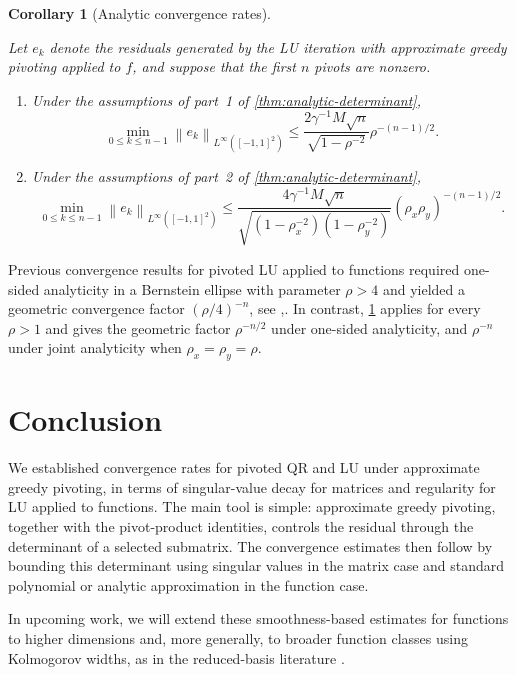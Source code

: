 \documentclass[11pt]{article}
\newtheorem{corollary}[corollary]{Corollary}
\theoremstyle{definition}
\theoremstyle{remark}
\newcommand{\norm}[1]{\left\lVert #1\right\rVert}
\begin{document}
\begin{corollary}[Analytic convergence rates]
\label{cor:functional-analytic-rates}

Let $e_k$ denote the residuals generated by the LU iteration
with approximate greedy pivoting applied to $f$, and suppose that the first $n$
pivots are nonzero.
\begin{enumerate}
\item
Under the assumptions of part~1 of
\cref{thm:analytic-determinant},
\[
    \min_{0\le k\le n-1}
    \norm{e_k}_{L^\infty([-1,1]^2)}
    \le
    \frac{2\gamma^{-1}M\sqrt n}
         {\sqrt{1-\rho^{-2}}}
    \rho^{-(n-1)/2}.
\]

\item
Under the assumptions of part~2 of
\cref{thm:analytic-determinant},
\[
    \min_{0\le k\le n-1}
    \norm{e_k}_{L^\infty([-1,1]^2)}
    \le
    \frac{4\gamma^{-1}M\sqrt n}
         {\sqrt{(1-\rho_x^{-2})(1-\rho_y^{-2})}}
    (\rho_x\rho_y)^{-(n-1)/2}.
\]
\end{enumerate}
\end{corollary}

Previous convergence results for pivoted LU applied to functions
required one-sided analyticity in a Bernstein ellipse
with parameter $\rho>4$ and yielded a geometric convergence factor
$(\rho/4)^{-n}$, see
\cite[Corollary~13]{CortinovisKressnerMassei2020},\cite[Theorem~8.1]{TownsendTrefethen2015}.
In contrast, \cref{cor:functional-analytic-rates} applies for every
$\rho>1$ and gives the geometric factor $\rho^{-n/2}$ under one-sided
analyticity, and $\rho^{-n}$ under joint analyticity when
$\rho_x=\rho_y=\rho$.

\section{Conclusion}
\label{sec:conclusion}

We established convergence rates for pivoted QR and LU under approximate
greedy pivoting, in terms of singular-value decay for matrices and
regularity for LU applied to functions. The main tool is simple:
approximate greedy pivoting, together with the pivot-product identities,
controls the residual through the determinant of a selected submatrix.
The convergence estimates then follow by bounding this determinant using
singular values in the matrix case and standard polynomial or analytic
approximation in the function case.

In upcoming work, we will extend these smoothness-based estimates for
functions to higher dimensions and, more generally, to broader function
classes using Kolmogorov widths, as in the reduced-basis literature
\cite{BinevEtAl2011}.
\end{document}
